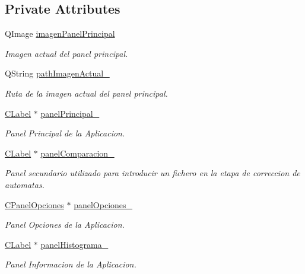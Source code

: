 \subsection*{Private Attributes}
\begin{DoxyCompactItemize}
\item 
Q\+Image \hyperlink{classCAplicacion_a0d02a7838c0974bffc76e8dd08848dc9}{imagen\+Panel\+Principal}
\begin{DoxyCompactList}\small\item\em Imagen actual del panel principal. \end{DoxyCompactList}\item 
Q\+String \hyperlink{classCAplicacion_a990b6780cd5e1d941f01e7df20958587}{path\+Imagen\+Actual\+\_\+}
\begin{DoxyCompactList}\small\item\em Ruta de la imagen actual del panel principal. \end{DoxyCompactList}\item 
\hyperlink{classCLabel}{C\+Label} $\ast$ \hyperlink{classCAplicacion_ac795b4ce529859a5d5c03e15ed78d967}{panel\+Principal\+\_\+}
\begin{DoxyCompactList}\small\item\em Panel Principal de la Aplicacion. \end{DoxyCompactList}\item 
\hyperlink{classCLabel}{C\+Label} $\ast$ \hyperlink{classCAplicacion_a16f1c9d4fd9168f0787c210588a048be}{panel\+Comparacion\+\_\+}
\begin{DoxyCompactList}\small\item\em Panel secundario utilizado para introducir un fichero en la etapa de correccion de automatas. \end{DoxyCompactList}\item 
\hyperlink{classCPanelOpciones}{C\+Panel\+Opciones} $\ast$ \hyperlink{classCAplicacion_adc38c4ae217096b72da9911d6cf39f47}{panel\+Opciones\+\_\+}
\begin{DoxyCompactList}\small\item\em Panel Opciones de la Aplicacion. \end{DoxyCompactList}\item 
\hyperlink{classCLabel}{C\+Label} $\ast$ \hyperlink{classCAplicacion_a5edbe0644420ff42d80a2a5d247c69eb}{panel\+Histograma\+\_\+}
\begin{DoxyCompactList}\small\item\em Panel Informacion de la Aplicacion. \end{DoxyCompactList}\item 

\end{DoxyCompactItemize}
